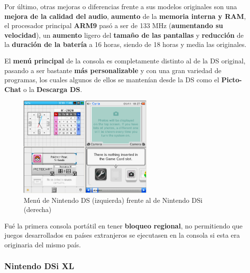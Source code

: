\vspace{0.5cm}

Por último, otras mejoras o diferencias frente a sus modelos originales son una \textbf{mejora de la calidad del audio}, \textbf{aumento} de la \textbf{memoria interna y RAM}, el procesador principal \textbf{ARM9} pasó a ser de 133 MHz (\textbf{aumentando su velocidad}), un \textbf{aumento} ligero del \textbf{tamaño de las pantallas} y \textbf{reducción} de la \textbf{duración de la batería} a 16 horas, siendo de 18 horas y media las originales.

\vspace{0.5cm}

El \textbf{menú principal} de la consola es completamente distinto al de la DS original, pasando a ser bastante \textbf{más personalizable} y con una gran variedad de programas, los cuales algunos de ellos se mantenían desde la DS como el \textbf{Picto-Chat} o la \textbf{Descarga DS}.

\vspace{0.5cm}

\begin{figure}[htbp]
\centering
  \includegraphics[width=0.6\textwidth]{archivos/nds-ndsi-menu.png}
  \caption{Menú de Nintendo DS (izquierda) frente al de Nintendo DSi (derecha)}
  \label{fig:menu-comparacion} %
\end{figure}

\vspace{0.5cm}

Fué la primera consola portátil en tener \textbf{bloqueo regional}, no permitiendo que juegos desarrollados en países extranjeros se ejecutasen en la consola si esta era originaria del mismo país.

\vspace{1cm}

\subsubsection{Nintendo DSi XL}

